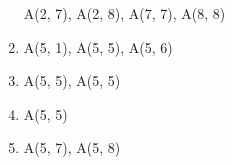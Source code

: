 \documentclass[11pt, fleqn]{article}
\begin{document}
\begin{enumerate}
\begin{minipage}[t]{13cm}
														  A(2, 7), A(2, 8), A(7, 7), A(8, 8)
														 \end{minipage} 
	\item {}  \begin{minipage}[t]{13cm}
														  A(5, 1), A(5, 5), A(5, 6)
														 \end{minipage} 
	\item {} \begin{minipage}[t]{13cm}
														  A(5, 5), {\color{blue} A(5, 5)}
														 \end{minipage} 
	\item {} \begin{minipage}[t]{13cm}
														  A(5, 5)
														 \end{minipage} 
	\item {} \begin{minipage}[t]{13cm}
														  A(5, 7), A(5, 8)
														 \end{minipage}
													 
\end{enumerate}
\end{document}
